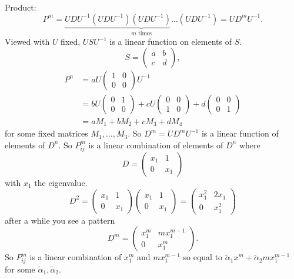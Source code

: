\documentclass[10pt, a4paper]{article}
\begin{document}
\begin{problem}
\begin{solution}
        Product:
        \[
        P ^ m = \underbrace{UDU ^ {-1}(UDU ^ {-1})(UDU ^ {-1})\dots (UDU ^ {-1})}_{\text{$m$ times}} = UD ^ mU ^ {-1}.
        \]
        Viewed with $U$ fixed,
        $USU ^ {-1}$ is a linear function on elements of $S$.
        \[
        S = \begin{pmatrix}
            a & b \\ c & d
        \end{pmatrix},
        \]
        \begin{align*}
            P ^ n &= aU\begin{pmatrix}
                1 & 0 \\ 0 & 0
            \end{pmatrix}U ^ {-1} \\
            &= bU\begin{pmatrix}
                0 & 1 \\ 0 & 0
            \end{pmatrix} + cU\begin{pmatrix}
                0 & 0 \\ 1 & 0
            \end{pmatrix} + d\begin{pmatrix}
                0 & 0 \\ 0 & 1
            \end{pmatrix} \\
            &= aM_1 + bM_2 + cM_3 + dM_4
        \end{align*}
        for some fixed matrices $M_1, \dotsc, M_3$.
        So $D ^ m = UD ^ mU ^ {-1}$ is a linear function of elements of $D ^ n$.
        So $P_{ij}^{m}$ is a linear combination of elements of $D ^ n$ where
        \[
        D = \begin{pmatrix}
            x_1 & 1 \\ 0 & x_1
        \end{pmatrix}
        \]
        with $x_1$ the eigenvalue.
        \[
        D ^ 2 = \begin{pmatrix}
            x_1 & 1 \\ 0 & x_1
        \end{pmatrix}\begin{pmatrix}
            x_1 & 1 \\ 0 & x_1
        \end{pmatrix} = \begin{pmatrix}
            x_1 ^ 2 & 2x_1 \\
            0 & x_1 ^ 2
        \end{pmatrix}
        \]
        after a while you see a pattern
        \[
        D ^ m = \begin{pmatrix}
            x_1 ^ m & mx_1 ^ {m - 1} \\ 0 & x_1 ^ m
        \end{pmatrix}.
        \]
        So $P_{ij}^{m}$ is a linear combination of $x_1 ^ m$ and $mx_1 ^ {m - 1}$ so equal to $\tilde{\alpha}_1x ^ m + \tilde{\alpha}_2mx_1 ^ {m - 1}$ for some $\tilde{\alpha}_1, \tilde{\alpha}_2$.
    \end{solution}
\end{problem}
\end{document}
